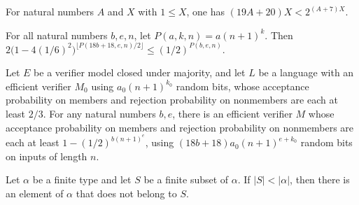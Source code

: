 \begin{theorem}
\label{Randomized.shift_count_lt_two_pow}
\leanok
{}
For natural numbers $A$ and $X$ with $1\le X$, one has $(19A+20)X<2^{(A+7)X}$.
\end{theorem}

\begin{theorem}
\label{Randomized.const_tail_bound}
\leanok
{}
For all natural numbers $b,e,n$, let $P(a,k,n)=a(n+1)^k$. Then
$2\bigl(1-4(1/6)^2\bigr)^{\lfloor P(18b+18,e,n)/2\rfloor}\le (1/2)^{P(b,e,n)}$.
\end{theorem}

\begin{theorem}
\label{Randomized.amplify_concrete}
\leanok
{}
Let $E$ be a verifier model closed under majority, and let $L$ be a language with an
efficient verifier $M_0$ using $a_0(n+1)^{k_0}$ random bits, whose acceptance
probability on members and rejection probability on nonmembers are each at least $2/3$.
For any natural numbers $b,e$, there is an efficient verifier $M$ whose acceptance
probability on members and rejection probability on nonmembers are each at least
$1-(1/2)^{b(n+1)^e}$, using $(18b+18)a_0(n+1)^{e+k_0}$ random bits on inputs of length
$n$.
\end{theorem}

\begin{theorem}
\label{Randomized.exists_notMem_of_card_lt}
\leanok
{}
Let $\alpha$ be a finite type and let $S$ be a finite subset of $\alpha$. If
$|S|<|\alpha|$, then there is an element of $\alpha$ that does not belong to $S$.
\end{theorem}

